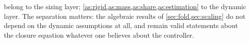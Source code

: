 \begin{remark}
 belong to the sizing layer;
\cref{as:rigid,as:mass,as:share,as:estimation} to the dynamic layer. The
separation matters: the algebraic results of \cref{sec:fold,sec:scaling} do not
depend on the dynamic assumptions at all, and remain valid statements about the
closure equation whatever one believes about the controller.
\end{remark}
